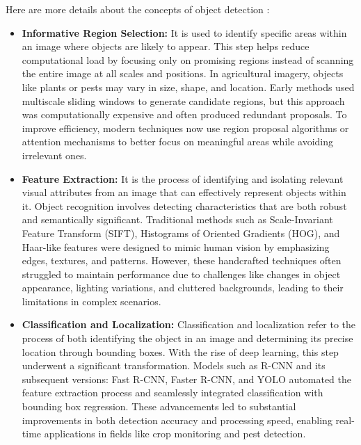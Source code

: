 Here are more details about the concepts of object detection \parencite{zhao2019objectdetection}: 
\begin{itemize}
    \item \textbf{Informative Region Selection:} It is used to identify specific areas within an image where objects are likely to appear. This step helps reduce computational load by focusing only on promising regions instead of scanning the entire image at all scales and positions. In agricultural imagery, objects like plants or pests may vary in size, shape, and location. Early methods used multiscale sliding windows to generate candidate regions, but this approach was computationally expensive and often produced redundant proposals. To improve efficiency, modern techniques now use region proposal algorithms or attention mechanisms to better focus on meaningful areas while avoiding irrelevant ones.
    \item \textbf{Feature Extraction:} It is the process of identifying and isolating relevant visual attributes from an image that can effectively represent objects within it. Object recognition involves detecting characteristics that are both robust and semantically significant. Traditional methods such as Scale-Invariant Feature Transform (SIFT), Histograms of Oriented Gradients (HOG), and Haar-like features were designed to mimic human vision by emphasizing edges, textures, and patterns. However, these handcrafted techniques often struggled to maintain performance due to challenges like changes in object appearance, lighting variations, and cluttered backgrounds, leading to their limitations in complex scenarios.
    \item \textbf{Classification and Localization:} Classification and localization refer to the process of both identifying the object in an image and determining its precise location through bounding boxes. With the rise of deep learning, this step underwent a significant transformation. Models such as R-CNN and its subsequent versions: Fast R-CNN, Faster R-CNN, and YOLO automated the feature extraction process and seamlessly integrated classification with bounding box regression. These advancements led to substantial improvements in both detection accuracy and processing speed, enabling real-time applications in fields like crop monitoring and pest detection.
\end{itemize}

